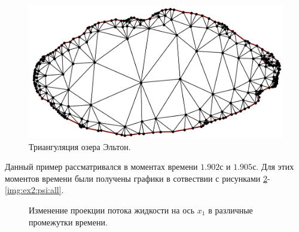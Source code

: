 \documentclass[14pt]{extreport}
\begin{document}
\begin{figure}[H]
\centerline{
\includegraphics[width=1.0\linewidth]{images/ex2/mesh}}
\caption{Триангуляция озера Эльтон.}
\label{img:ex2:mesh}
\end{figure}

Данный пример рассматривался в моментах времени $1.902$с и $1.905$с. Для этих моментов времени были получены графики в сотвествии с рисунками \ref{img:ex2:q1:all}-\ref{img:ex2:psi:all}.

\begin{figure}[H]
  \centering
  \hfill
  \caption{Изменение проекции потока жидкости на ось $x_1$ в различные промежутки времени.}
  \label{img:ex2:q1:all}
\end{figure}
\end{document}
